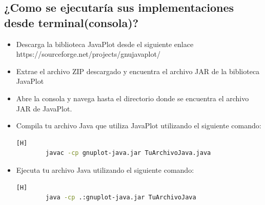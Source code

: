 \documentclass{article}
\begin{document}
	\subsection{¿Como se ejecutaría sus implementaciones desde terminal(consola)?}
	\begin{itemize}
	\item Descarga la biblioteca JavaPlot desde el siguiente enlace https://sourceforge.net/projects/gnujavaplot/
	\item Extrae el archivo ZIP descargado y encuentra el archivo JAR de la biblioteca JavaPlot 
	\item Abre la consola y navega hasta el directorio donde se encuentra el archivo JAR de JavaPlot.
	\item Compila tu archivo Java que utiliza JavaPlot utilizando el siguiente comando:
	\begin{lstlisting}[language=bash,caption={}][H]
		javac -cp gnuplot-java.jar TuArchivoJava.java
	\end{lstlisting}
	
	\item Ejecuta tu archivo Java utilizando el siguiente comando:
	\begin{lstlisting}[language=bash,caption={}][H]
		java -cp .:gnuplot-java.jar TuArchivoJava
	\end{lstlisting}
	
	\end{itemize}	

	
\end{document}
